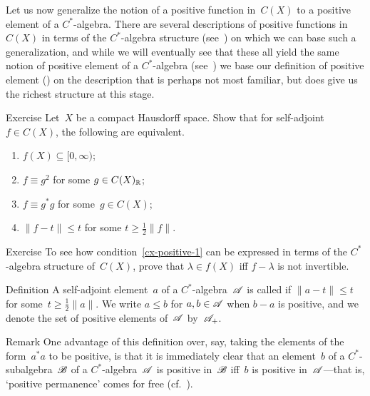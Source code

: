 \documentclass[a]{subfiles}
\begin{document}
\begin{parsec}%
\begin{point}%
Let us now generalize the notion of a positive function
in~$C(X)$
to a positive element of a $C^*$-algebra.
There are several descriptions of
positive functions in~$C(X)$ in terms of the $C^*$-algebra structure
(see~) on which we can base such a  generalization,
and while we will eventually see that these all yield the same notion
of positive element of a $C^*$-algebra (see~)
we base our definition of positive element ()
on the description that is perhaps
not most familiar,
but does give us the richest structure at this stage.
\end{point}
\begin{point}[cx-positive]{Exercise}%
Let~$X$ be a compact Hausdorff space.
Show that for self-adjoint $f\in C(X)$, the following are equivalent.
\begin{enumerate}
\item \label{cx-positive-1}
$f(X)\subseteq [0,\infty)$;
\item
$f\equiv g^2$ for some $g\in C(X)_{\mathbb{R}}$;
\item
$f\equiv g^* g$ for some~$g\in C(X)$;
\item
$\|f-t\|\leq t$ for some $t\geq \frac{1}{2}\|f\|$.
\end{enumerate}
\begin{point}{Exercise}%
To see how condition~\ref{cx-positive-1}
can be expressed in terms of the $C^*$-algebra structure of~$C(X)$,
prove that  $\lambda\in f(X)$ iff $f-\lambda$
is not invertible.
\end{point}
\end{point}
\begin{point}{Definition}%
A self-adjoint element~$a$ of a $C^*$-algebra~$\mathscr{A}$ is called
 if $\|a-t\|\leq t$
for some~$t\geq \frac{1}{2}\|a\|$.
We write $a\leq b$ for $a,b\in\mathscr{A}$ when $b-a$ is positive,
and we denote the set of positive elements of~$\mathscr{A}$
by~$\mathscr{A}_{+}$.
\begin{point}{Remark}%
One advantage of this
definition
over, say, taking the elements of the form~$a^*a$
to be positive,
is that it is immediately clear
that an element~$b$ of a $C^*$-subalgebra~$\mathscr{B}$
of a $C^*$-algebra~$\mathscr{A}$ is positive in~$\mathscr{B}$
iff~$b$ is positive in~$\mathscr{A}$---that is,
`positive permanence' comes for free (cf.~).
\end{point}
\end{point}

\end{parsec}
\end{document}
